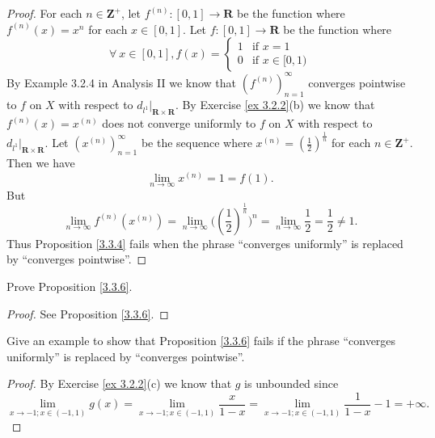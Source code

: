 \begin{proof}
    For each \(n \in \mathbf{Z}^+\), let \(f^{(n)} : [0, 1] \to \mathbf{R}\) be the function where \(f^{(n)}(x) = x^n\) for each \(x \in [0, 1]\).
    Let \(f : [0, 1] \to \mathbf{R}\) be the function where
    \[
        \forall\ x \in [0, 1], f(x) = \begin{cases}
            1 & \text{if } x = 1        \\
            0 & \text{if } x \in [0, 1)
        \end{cases}
    \]
    By Example 3.2.4 in Analysis II we know that \((f^{(n)})_{n = 1}^\infty\) converges pointwise to \(f\) on \(X\) with respect to \(d_{l^1}|_{\mathbf{R} \times \mathbf{R}}\).
    By Exercise \ref{ex 3.2.2}(b) we know that \(f^{(n)}(x) = x^{(n)}\) does not converge uniformly to \(f\) on \(X\) with respect to \(d_{l^1}|_{\mathbf{R} \times \mathbf{R}}\).
    Let \((x^{(n)})_{n = 1}^\infty\) be the sequence where \(x^{(n)} = (\frac{1}{2})^{\frac{1}{n}}\) for each \(n \in \mathbf{Z}^+\).
    Then we have
    \[
        \lim_{n \to \infty} x^{(n)} = 1 = f(1).
    \]
    But
    \[
        \lim_{n \to \infty} f^{(n)}(x^{(n)}) = \lim_{n \to \infty} \big((\frac{1}{2})^{\frac{1}{n}}\big)^n = \lim_{n \to \infty} \frac{1}{2} = \frac{1}{2} \neq 1.
    \]
    Thus Proposition \ref{3.3.4} fails when the phrase ``converges uniformly'' is replaced by ``converges pointwise''.
\end{proof}

\begin{exercise}\label{ex 3.3.6}
    Prove Proposition \ref{3.3.6}.
\end{exercise}

\begin{proof}
    See Proposition \ref{3.3.6}.
\end{proof}

\begin{exercise}\label{ex 3.3.7}
    Give an example to show that Proposition \ref{3.3.6} fails if the phrase ``converges uniformly'' is replaced by ``converges pointwise''.
\end{exercise}

\begin{proof}
    By Exercise \ref{ex 3.2.2}(c) we know that \(g\) is unbounded since
    \[
        \lim_{x \to -1 ; x \in (-1, 1)} g(x) = \lim_{x \to -1 ; x \in (-1, 1)} \frac{x}{1 - x} = \lim_{x \to -1 ; x \in (-1, 1)} \frac{1}{1 - x} - 1 = +\infty.
    \]
\end{proof}

